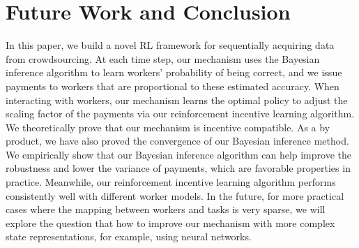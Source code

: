\documentclass{article}
\theoremstyle{lemmas}
\begin{document}








\section{Future Work and Conclusion}
In this paper, we build a novel RL framework for sequentially acquiring data from crowdsourcing.
At each time step, our mechanism uses the Bayesian inference algorithm to learn workers' probability of being correct, and we issue payments to workers that are proportional to these estimated accuracy.
When interacting with workers, our mechanism learns the optimal policy to adjust the scaling factor of the payments via our reinforcement incentive learning algorithm.
We theoretically prove that our mechanism is incentive compatible. As a by product, we have also proved the convergence of our Bayesian inference method.
We empirically show that our Bayesian inference algorithm can help improve the robustness and lower the variance of payments, which are favorable properties in practice.
Meanwhile, our reinforcement incentive learning algorithm performs consistently well with different worker models.
In the future, for more practical cases where the mapping between workers and tasks is very sparse, we will explore the question that how to improve our mechanism with more complex state representations, for example, using neural networks.



\end{document}
